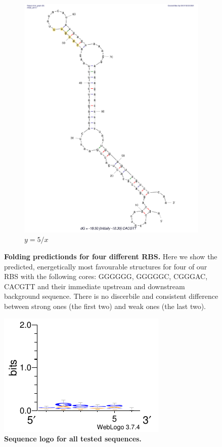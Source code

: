 \begin{figure}
\begin{subfigure}[b]{0.49\textwidth}
         \includegraphics[scale=0.25]{plots/Supplementary/Structure_CACGTT.pdf}
         \caption{$y=5/x$}
         \label{fig:CACGTT}
     \end{subfigure}
        \caption{\textbf{Folding predictionds for four different RBS.} Here we show the predicted, energetically most favourable structures for four of our RBS with the following cores: GGGGGG, GGGGGC, CGGGAC, CACGTT and their immediate upstream and downstream background sequence. There is no discerbile and consistent difference between strong ones (the first two) and weak ones (the last two).}
        \label{fig:structures}
\end{figure}

\begin{figure}[h]
    \centering
    \includegraphics[scale=0.32]{paper/plots/Supplementary/All_logo.pdf}
    \caption{\textbf{Sequence logo for all tested sequences.} }
    \label{fig: All_logo}
\end{figure}


